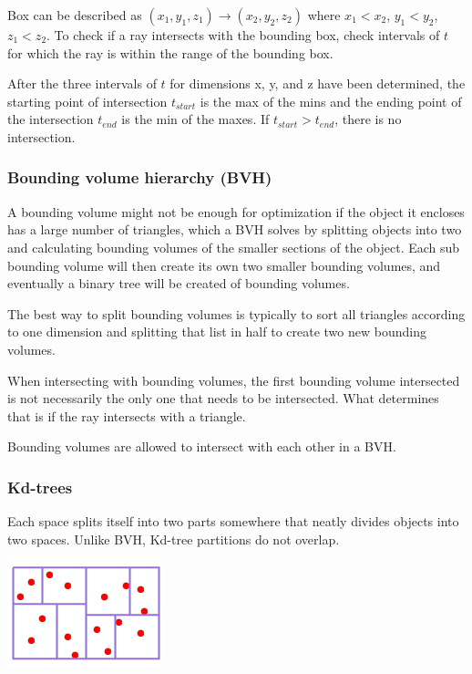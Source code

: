 \documentclass[12pt]{article}
\begin{document}
Box can be described as $(x_1,y_1,z_1) \rightarrow (x_2,y_2,z_2)$ where
$x_1 < x_2$, $y_1 < y_2$, $z_1 < z_2$. To check if a ray intersects
with the bounding box, check intervals of $t$ for which the ray is
within the range of the bounding box.

After the three intervals of $t$ for dimensions x, y, and z have been
determined, the starting point of intersection $t_{start}$ is the max of the mins
and the ending point of the intersection $t_{end}$ is the min of the maxes.
If $t_{start} > t_{end}$, there is no intersection.

\subsubsection{Bounding volume hierarchy (BVH)}

A bounding volume might not be enough for optimization if the object
it encloses has a large number of triangles, which a BVH solves by
splitting objects into two and calculating bounding volumes of the smaller
sections of the object. Each sub bounding volume will then create its
own two smaller bounding volumes, and eventually a binary tree will
be created of bounding volumes.

The best way to split bounding volumes is typically to sort all triangles
according to one dimension and splitting that list in half to create
two new bounding volumes.

When intersecting with bounding volumes, the first bounding volume
intersected is not necessarily the only one that needs to be intersected.
What determines that is if the ray intersects with a triangle.

Bounding volumes are allowed to intersect with each other in a BVH.

\subsubsection{Kd-trees}

Each space splits itself into two parts somewhere that neatly
divides objects into two spaces. Unlike BVH, Kd-tree partitions do not overlap.

\includegraphics{images/kd-tree.png}
\end{document}
